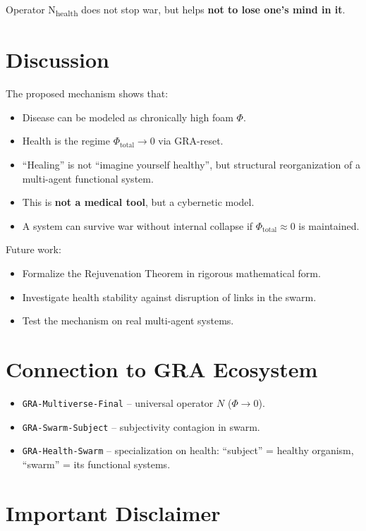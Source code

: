 \documentclass[11pt,a4paper]{article}
\begin{document}
Operator N\textsubscript{health} does not stop war, but helps \textbf{not to lose one's mind in it}.

\section{Discussion}

The proposed mechanism shows that:
\begin{itemize}
  \item Disease can be modeled as chronically high foam $\Phi$.
  \item Health is the regime $\Phi_{\text{total}} \to 0$ via GRA-reset.
  \item ``Healing'' is not ``imagine yourself healthy'', but structural reorganization of a multi-agent functional system.
  \item This is \textbf{not a medical tool}, but a cybernetic model.
  \item A system can survive war without internal collapse if $\Phi_{\text{total}} \approx 0$ is maintained.
\end{itemize}

Future work:
\begin{itemize}
  \item Formalize the Rejuvenation Theorem in rigorous mathematical form.
  \item Investigate health stability against disruption of links in the swarm.
  \item Test the mechanism on real multi-agent systems.
\end{itemize}

\section{Connection to GRA Ecosystem}

\begin{itemize}
  \item \texttt{GRA-Multiverse-Final} -- universal operator $N$ ($\Phi \to 0$).
  \item \texttt{GRA-Swarm-Subject} -- subjectivity contagion in swarm.
  \item \texttt{GRA-Health-Swarm} -- specialization on health: ``subject'' = healthy organism, ``swarm'' = its functional systems.
\end{itemize}

\section*{Important Disclaimer}
\end{document}
